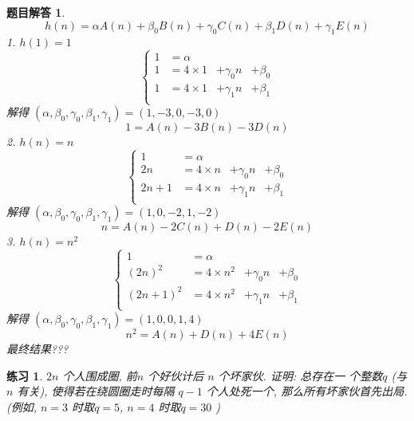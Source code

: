 \documentclass[mode=geye]{elegantnote}
\newtheorem{exercise}{练习}
\newtheorem{answer}{题目解答}
\begin{document}
\begin{answer}
	\begin{equation*}
		h(n)=\alpha A(n)+\beta_0 B(n)+ \gamma_0 C(n)+\beta_1 D(n) + \gamma_1 E(n)
	\end{equation*}
	1. $ h(1)=1 $ 
	\begin{equation*}
		\left\{
			\begin{array}{llll}
				1 &= \alpha &&\\
				1 &= 4\times 1 &+ \gamma_0 n &+ \beta_0\\
				1 &= 4\times 1 &+ \gamma_1 n &+ \beta_1\\
			\end{array}
		\right.
	\end{equation*}
	解得 $ (\alpha, \beta_0,\gamma_0,\beta_1,\gamma_1)=(1,-3,0,-3,0) $ 
	\begin{equation*}
		1 = A(n)-3B(n)-3D(n)
	\end{equation*}
	2. $ h(n)=n $ 
	\begin{equation*}
		\left\{
			\begin{array}{llll}
				1 &= \alpha &&\\
				2n &= 4\times n &+ \gamma_0 n &+ \beta_0\\
				2n+1 &= 4\times n &+ \gamma_1 n &+ \beta_1\\
			\end{array}
		\right.
	\end{equation*}
	解得 $ (\alpha, \beta_0,\gamma_0,\beta_1,\gamma_1)=(1,0,-2,1,-2) $ 
	\begin{equation*}
		n = A(n)-2C(n)+D(n)-2E(n)
	\end{equation*}
	3. $ h(n)=n^2 $ 
	\begin{equation*}
		\left\{
			\begin{array}{llll}
				1 &= \alpha &&\\
				(2n)^2 &= 4\times n^2 &+ \gamma_0 n &+ \beta_0\\
				(2n+1)^2 &= 4\times n^2 &+ \gamma_1 n &+ \beta_1\\
			\end{array}
		\right.
	\end{equation*}
	解得 $ (\alpha, \beta_0,\gamma_0,\beta_1,\gamma_1)=(1,0,0,1,4) $ 
	\begin{equation*}
		n^2 = A(n)+D(n)+4E(n)
	\end{equation*}
	最终结果???
\end{answer}

\begin{exercise}
	$ 2 n $  个人围成圈, 前$ n $ 个好伙计后 $ n $ 个坏家伙. 证明: 总存在一
个整数$  q $  (与 $ n $ 有关), 使得若在绕圆圈走时每隔 $ q - 1 $  个人处死一个, 那么所有坏家伙首先出局.\\
(例如, $ n=3 $ 时取$ q=5 $, $ n=4 $ 时取$ q=30
 $ )
\end{exercise}
\end{document}
